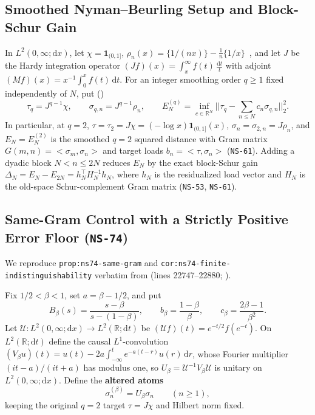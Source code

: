 \documentclass[11pt]{article}
\def\norm#1{||#1||}%
\def\ip#1#2{<#1,#2>}%
\theoremstyle{remark}
\newcommand{\norm}[1]{\left\lVert #1\right\rVert}
\newcommand{\ip}[2]{\left\langle #1,#2\right\rangle}
\newcommand{\dd}{\mathrm d}
\begin{document}
\subsection{Smoothed Nyman--Beurling Setup and Block-Schur Gain}
In $L^2(0,\infty;\dd x)$, let $\chi = \mathbf{1}_{(0,1]}$, $\rho_n(x) = \{1/(nx)\} - \frac{1}{n}\{1/x\}$~\cite{BaezDuarteStrong}, and let $J$ be the Hardy integration operator $(Jf)(x) = \int_x^\infty f(t)\,\frac{\dd t}{t}$ with adjoint $(Mf)(x) = x^{-1}\int_0^x f(t)\,\dd t$. For an integer smoothing order $q \ge 1$ fixed independently of $N$, put ()
\begin{equation}\label{eq:nb-smoothed-def}
  \tau_q = J^{q-1}\chi, \qquad \sigma_{q,n} = J^{q-1}\rho_n, \qquad E_N^{(q)} = \inf_{c \in \mathbb{R}^N} \norm{\tau_q - \sum_{n \le N} c_n \sigma_{q,n}}_2^2.
\end{equation}
In particular, at $q = 2$, $\tau = \tau_2 = J\chi = (-\log x)\mathbf{1}_{(0,1]}(x)$, $\sigma_n = \sigma_{2,n} = J\rho_n$, and $E_N = E_N^{(2)}$ is the smoothed $q = 2$ squared distance with Gram matrix $G(m,n) = \ip{\sigma_m}{\sigma_n}$ and target loads $b_n = \ip{\tau}{\sigma_n}$ (\texttt{NS-61}). Adding a dyadic block $N < n \le 2N$ reduces $E_N$ by the exact block-Schur gain $\Delta_N = E_N - E_{2N} = h_N^\top H_N^{-1} h_N$, where $h_N$ is the residualized load vector and $H_N$ is the old-space Schur-complement Gram matrix (\texttt{NS-53}, \texttt{NS-61}).

\subsection{Same-Gram Control with a Strictly Positive Error Floor (\texttt{NS-74})}
We reproduce \texttt{prop:ns74-same-gram} and \texttt{cor:ns74-finite-indistinguishability} verbatim from  (lines 22747--22880; ).

Fix $1/2 < \beta < 1$, set $a = \beta - 1/2$, and put
\begin{equation}\label{eq:ns74-params}
  B_\beta(s) = \frac{s - \beta}{s - (1 - \beta)}, \qquad b_\beta = \frac{1 - \beta}{\beta}, \qquad c_\beta = \frac{2\beta - 1}{\beta^2}.
\end{equation}
Let $\mathcal{U} : L^2(0,\infty;\dd x) \to L^2(\mathbb{R};\dd t)$ be $(\mathcal{U}f)(t) = e^{-t/2}f(e^{-t})$. On $L^2(\mathbb{R};\dd t)$ define the causal $L^1$-convolution $(V_\beta u)(t) = u(t) - 2a\int_{-\infty}^t e^{-a(t-r)}u(r)\,\dd r$, whose Fourier multiplier $(it-a)/(it+a)$ has modulus one, so $U_\beta = \mathcal{U}^{-1}V_\beta\mathcal{U}$ is unitary on $L^2(0,\infty;\dd x)$. Define the \textbf{altered atoms}
\begin{equation}\label{eq:ns74-altered-atoms}
  \sigma_n^{(\beta)} = U_\beta \sigma_n \qquad (n \ge 1),
\end{equation}
keeping the original $q = 2$ target $\tau = J\chi$ and Hilbert norm fixed.
\end{document}

